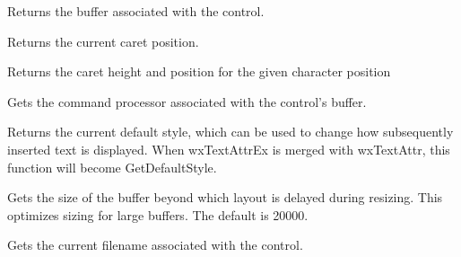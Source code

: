 \label{wxrichtextctrlgetbuffer}



Returns the buffer associated with the control.

\label{wxrichtextctrlgetcaretposition}


Returns the current caret position.

\label{wxrichtextctrlgetcaretpositionforindex}


Returns the caret height and position for the given character position

\label{wxrichtextctrlgetcommandprocessor}


Gets the command processor associated with the control's buffer.

\label{wxrichtextctrlgetdefaultstyleex}


Returns the current default style, which can be used to change how subsequently inserted
text is displayed. When wxTextAttrEx is merged with wxTextAttr, this function
will become GetDefaultStyle.

\label{wxrichtextctrlgetdelayedlayoutthreshold}


Gets the size of the buffer beyond which layout is delayed during resizing.
This optimizes sizing for large buffers. The default is 20000.

\label{wxrichtextctrlgetfilename}


Gets the current filename associated with the control.

\label{wxrichtextctrlgetfirstvisibleposition}

